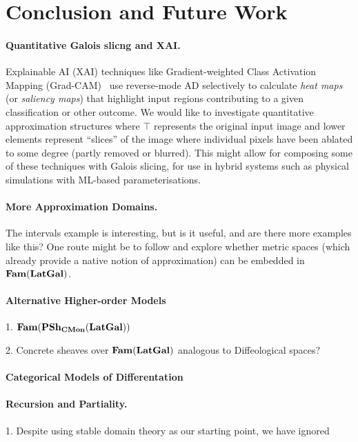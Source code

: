 \section{Conclusion and Future Work}
\label{sec:conclusion}

\paragraph{Quantitative Galois slicng and XAI.}  Explainable AI (XAI) techniques like Gradient-weighted Class
Activation Mapping (Grad-CAM)~\cite{selvaraju20} use reverse-mode AD selectively to calculate \emph{heat maps}
(or \emph{saliency maps}) that highlight input regions contributing to a given classification or other
outcome. We would like to investigate quantitative approximation structures where $\top$ represents the
original input image and lower elements represent ``slices'' of the image where individual pixels have been
ablated to some degree (partly removed or blurred). This might allow for composing some of these techniques
with Galois slicing, for use in hybrid systems such as physical simulations with ML-based parameterisations.

\paragraph{More Approximation Domains.} The intervals example is
interesting, but is it useful, and are there more examples like this?
One route might be to follow \cite{edalat-heckmann98} and explore
whether metric spaces (which already provide a native notion of
approximation) can be embedded in $\mathbf{Fam}(\mathbf{LatGal})$.

\paragraph{Alternative Higher-order Models}

1. $\mathbf{Fam}(\mathbf{PSh}_{\mathbf{CMon}}(\mathbf{LatGal}))$

2. Concrete sheaves over $\mathbf{Fam}(\mathbf{LatGal})$ analogous to Diffeological spaces?

\paragraph{Categorical Models of Differentation}

\paragraph{Recursion and Partiality.}
1. Despite using stable domain theory as our starting point, we have ignored

